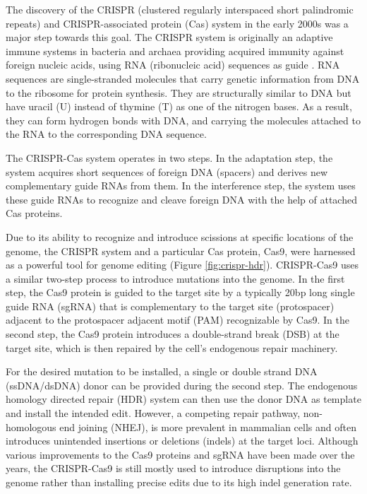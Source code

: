 The discovery of the CRISPR (clustered regularly interspaced short palindromic repeats) and CRISPR-associated protein (Cas) system in the early 2000s was a major step towards this goal. The CRISPR system is originally an adaptive immune systems in bacteria and archaea providing acquired immunity against foreign nucleic acids, using RNA (ribonucleic acid) sequences as guide \cite{jiangCRISPRCas9Structures2017}. RNA sequences are single-stranded molecules that carry genetic information from DNA to the ribosome for protein synthesis. They are structurally similar to DNA but have uracil (U) instead of thymine (T) as one of the nitrogen bases. As a result, they can form hydrogen bonds with DNA, and carrying the molecules attached to the RNA to the corresponding DNA sequence\cite{BrockBiologyMicroorganisms}.

The CRISPR-Cas system operates in two steps. In the adaptation step, the system acquires short sequences of foreign DNA (spacers) and derives new complementary guide RNAs from them. In the interference step, the system uses these guide RNAs to recognize and cleave foreign DNA with the help of attached Cas proteins\cite{garneauCRISPRCasBacterial2010}.

Due to its ability to recognize and introduce scissions at specific locations of the genome, the CRISPR system and a particular Cas protein, Cas9, were harnessed as a powerful tool for genome editing (Figure \ref{fig:crispr-hdr}). CRISPR-Cas9 uses a similar two-step process to introduce mutations into the genome. In the first step, the Cas9 protein is guided to the target site by a typically 20bp long single guide RNA (sgRNA) that is complementary to the target site (protospacer) adjacent to the protospacer adjacent motif (PAM) recognizable by Cas9. In the second step, the Cas9 protein introduces a double-strand break (DSB) at the target site, which is then repaired by the cell's endogenous repair machinery. 

For the desired mutation to be installed, a single or double strand DNA (ssDNA/dsDNA) donor can be provided during the second step\cite{richardsonEnhancingHomologydirectedGenome2016,jasinRepairStrandBreaks2013}. The endogenous homology directed repair (HDR) system can then use the donor DNA as template and install the intended edit\cite{hsuDevelopmentApplicationsCRISPRCas92014}. However, a competing repair pathway, non-homologous end joining (NHEJ), is more prevalent in mammalian cells and often introduces unintended insertions or deletions (indels) at the target loci\cite{changNonhomologousDNAEnd2017}. Although various improvements to the Cas9 proteins and sgRNA have been made over the years, the CRISPR-Cas9 is still mostly used to introduce disruptions into the genome rather than installing precise edits due to its high indel generation rate\cite{kantorCRISPRCas9DNABaseEditing2020,koeppelPredictionPrimeEditing2023}.

